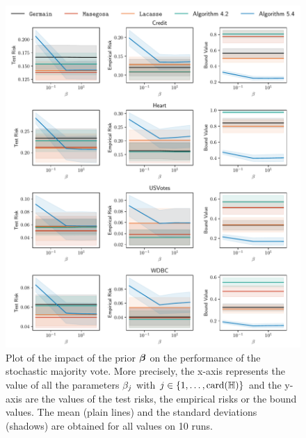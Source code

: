 \begin{noaddcontents}
\begin{figure}
    \centering
    \includegraphics[width=\textwidth]{chapter_5/figures/prior_1.pdf}
    \caption{
    Plot of the impact of the prior $\boldsymbol{\beta}$ on the performance of the stochastic majority vote.
    More precisely, the x-axis represents the value of all the parameters $\beta_j$ with $j\in\{1,\dots,\operatorname{card}(\mathbb{H})\}$ and the y-axis are the values of the test risks, the empirical risks or the bound values.
    The mean (plain lines) and the standard deviations (shadows) are obtained for all values on 10 runs.
    }
    \label{ap:mv-sto:fig:prior-1}
\end{figure}


\end{noaddcontents}
